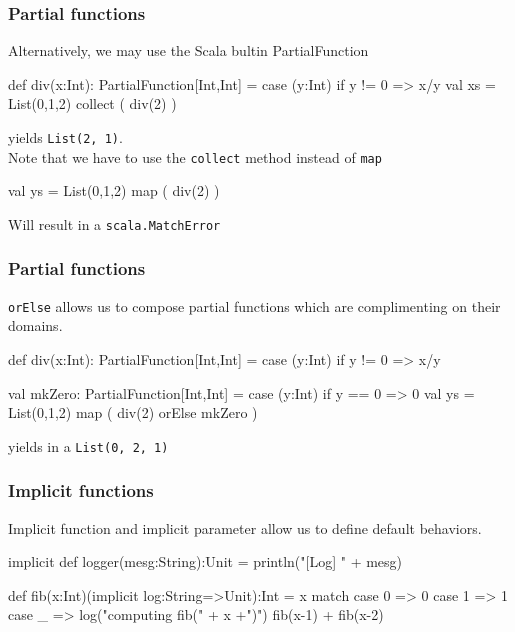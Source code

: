 \documentclass{beamer}
\newcommand{\beb}{\begin{exampleblock}}
\newcommand{\eeb}{\end{exampleblock}}
\begin{document}
\begin{frame}[fragile]
\frametitle{Partial functions}
Alternatively, we may use the Scala bultin PartialFunction 
\beb{}
\begin{code}
def div(x:Int): PartialFunction[Int,Int] = {
    case (y:Int) if y != 0 => x/y
}
val xs = List(0,1,2) collect ( div(2) ) 
\end{code}
\eeb
yields {\tt List(2, 1)}. \\ 
Note that we have to use the {\tt collect} method instead of {\tt map} 
\beb{}
\begin{code}
val ys = List(0,1,2) map ( div(2) ) 
\end{code}
\eeb
Will result in a {\tt scala.MatchError}
\end{frame}
\begin{frame}[fragile]
\frametitle{Partial functions}
{\tt orElse} allows us to compose partial functions which are
complimenting on their domains.
\beb{}
\begin{code}
def div(x:Int): PartialFunction[Int,Int] = {
    case (y:Int) if y != 0 => x/y
}

val mkZero: PartialFunction[Int,Int] = {
  case (y:Int) if y == 0 => 0
}
val ys = List(0,1,2) map ( div(2) orElse mkZero ) 
\end{code}
\eeb
yields in a {\tt List(0, 2, 1)}
\end{frame}
\begin{frame}[fragile]
\frametitle{Implicit functions}
Implicit function and implicit parameter allow us to define default behaviors.
\beb{}
\begin{code}
implicit def logger(mesg:String):Unit = { 
    println("[Log] " + mesg)
}

def fib(x:Int)(implicit log:String=>Unit):Int = {
  x match  {
    case 0 => 0
    case 1 => 1
    case _ => {
      log("computing fib(" + x +")")
      fib(x-1) + fib(x-2)         
    }
  }
}
\end{code}
\eeb
\end{frame}
\end{document}

